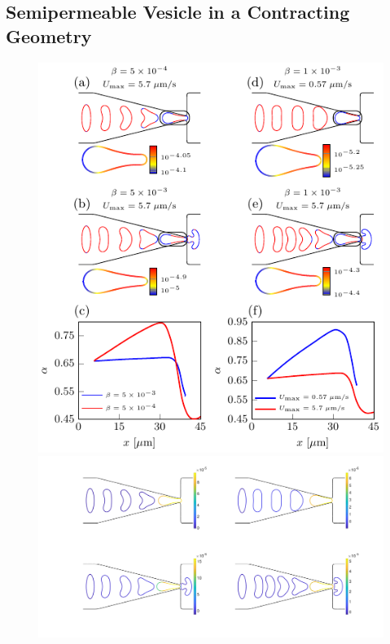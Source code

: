 \documentclass[prb,preprint,showpacs,preprintnumbers,amsmath,amssymb,longbibliography]{revtex4-1}
\newif\ifTikz
\begin{document}
\subsection{Semipermeable Vesicle in a Contracting Geometry} 
\begin{figure}[htp]
  \centering
  \ifTikz
  
  \else
  \begin{minipage}{0.45\textwidth}
    \centering
  \includegraphics{figures/contractingComposite.pdf}
  \end{minipage}
  \hfill
  \begin{minipage}{0.45\textwidth}
    \centering
  \includegraphics[width=\textwidth]{figures/contractingTensions1.pdf}

\end{minipage}
\end{figure}
\end{document}
